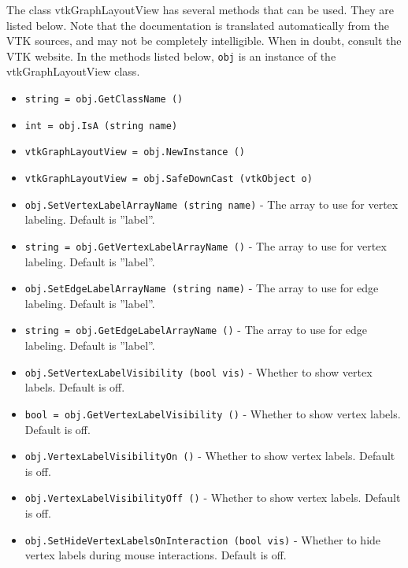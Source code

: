 The class vtkGraphLayoutView has several methods that can be used.
  They are listed below.
Note that the documentation is translated automatically from the VTK sources,
and may not be completely intelligible.  When in doubt, consult the VTK website.
In the methods listed below, \verb|obj| is an instance of the vtkGraphLayoutView class.
\begin{itemize}
\item  \verb|string = obj.GetClassName ()|

\item  \verb|int = obj.IsA (string name)|

\item  \verb|vtkGraphLayoutView = obj.NewInstance ()|

\item  \verb|vtkGraphLayoutView = obj.SafeDownCast (vtkObject o)|

\item  \verb|obj.SetVertexLabelArrayName (string name)| -  The array to use for vertex labeling.  Default is ''label''.

\item  \verb|string = obj.GetVertexLabelArrayName ()| -  The array to use for vertex labeling.  Default is ''label''.

\item  \verb|obj.SetEdgeLabelArrayName (string name)| -  The array to use for edge labeling.  Default is ''label''.

\item  \verb|string = obj.GetEdgeLabelArrayName ()| -  The array to use for edge labeling.  Default is ''label''.

\item  \verb|obj.SetVertexLabelVisibility (bool vis)| -  Whether to show vertex labels.  Default is off.

\item  \verb|bool = obj.GetVertexLabelVisibility ()| -  Whether to show vertex labels.  Default is off.

\item  \verb|obj.VertexLabelVisibilityOn ()| -  Whether to show vertex labels.  Default is off.

\item  \verb|obj.VertexLabelVisibilityOff ()| -  Whether to show vertex labels.  Default is off.

\item  \verb|obj.SetHideVertexLabelsOnInteraction (bool vis)| -  Whether to hide vertex labels during mouse interactions.  Default is off.


\end{itemize}
